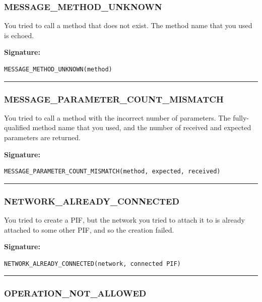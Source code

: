 \subsubsection{MESSAGE\_METHOD\_UNKNOWN}

You tried to call a method that does not exist.  The method name that you
used is echoed.

\vspace{0.3cm}
{\bf Signature:}
\begin{verbatim}MESSAGE_METHOD_UNKNOWN(method)\end{verbatim}
\begin{center}\rule{10em}{0.1pt}\end{center}

\subsubsection{MESSAGE\_PARAMETER\_COUNT\_MISMATCH}

You tried to call a method with the incorrect number of parameters.  The
fully-qualified method name that you used, and the number of received and
expected parameters are returned.

\vspace{0.3cm}
{\bf Signature:}
\begin{verbatim}MESSAGE_PARAMETER_COUNT_MISMATCH(method, expected, received)\end{verbatim}
\begin{center}\rule{10em}{0.1pt}\end{center}

\subsubsection{NETWORK\_ALREADY\_CONNECTED}

You tried to create a PIF, but the network you tried to attach it to is
already attached to some other PIF, and so the creation failed.

\vspace{0.3cm}
{\bf Signature:}
\begin{verbatim}NETWORK_ALREADY_CONNECTED(network, connected PIF)\end{verbatim}
\begin{center}\rule{10em}{0.1pt}\end{center}

\subsubsection{OPERATION\_NOT\_ALLOWED}


